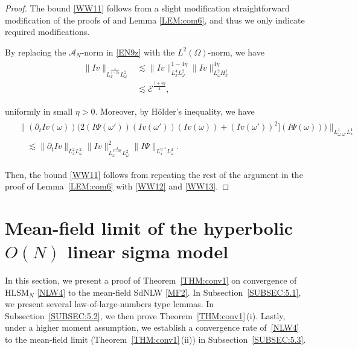 \documentclass[letterpaper, 11pt,  reqno]{amsart}
\newcommand{\1}{\hspace{0.5mm}\text{I}\hspace{0.2mm}}
\newcommand{\noi}{\noindent}
\newcommand{\dt}{\partial_t}
\newcommand{\les}{\lesssim}
\newcommand{\A}{\mathcal{A}}
\newcommand{\EE}{\mathcal{E}}
\newcommand{\HLS}{$\text{HLSM}_N$ }
\renewcommand{\O}{\Omega}
\renewcommand{\o}{\omega}
\numberwithin{equation}{section}
\numberwithin{theorem}{section}
\begin{document}
\begin{proof} 
The bound \eqref{WW11} follows
from a slight modification straightforward modification
of the proofs of 
\cite[Lemma~3.4]{GKOT}
and Lemma \ref{LEM:com6}, 
and thus we only indicate required modifications.


By replacing the $\A_N$-norm in \eqref{EN9z}
with the $L^2(\O)$-norm, we have 
 \begin{align}
\begin{split}
\|I v\|_{L^{\frac 4 {1- 2\eta}}_xL^2_\o }
&  \les 
\|I v\|_{L^4_x L^2_\o}^{1 - 4\eta}
\|I v\|_{L^2_\o H^1_x}^{4\eta}
\\
&   \les 
\EE^{\frac{1+4\eta}{4}} , 
\end{split}
\label{WW12}
 \end{align}

\noi
uniformly in small $\eta > 0$.
Moreover, by H\"older's inequality, we have 
\begin{align}
\begin{split}
& \Big\| (\dt I v (\o))
 \Big(  2  (I \Psi (\o') )( I v(\o')) ( I v(\o))  +  (I v(\o'))^2] (I \Psi (\o)) \Big) 
 \Big\|_{L^1_{\o, \o'}L^1_x}\\
& \quad \les \|\dt I v \|_{L^2_x L^2_\o}
\| I v \|_{L^\frac 4{1-2\eta}_x L^2_\o}^2
\| I \Psi \|_{L^{\eta^{-1}}_xL^2_\o}.
\end{split}
\label{WW13}
\end{align}

\noi
Then, the bound \eqref{WW11} follows from 
repeating the rest of the argument in the proof of Lemma~\ref{LEM:com6}
with \eqref{WW12} and \eqref{WW13}.
\end{proof}
























\section{Mean-field limit of 
the hyperbolic $O (N)$ linear sigma model}


\label{SEC:conv}

In this section, we present a proof of  Theorem~\ref{THM:conv1}
on convergence of \HLS 
 \eqref{NLW4}
to the mean-field SdNLW \eqref{MF2}. 
In Subsection~\ref{SUBSEC:5.1}, 
we present several law-of-large-numbers type lemmas.
In Subsection~\ref{SUBSEC:5.2}, 
we then prove Theorem~\ref{THM:conv1}\,(i). 
Lastly, 
under a higher moment assumption, 
we establish 
a convergence rate
 of~\eqref{NLW4}
 to the mean-field limit
 (Theorem~\ref{THM:conv1}\,(ii)) 
in Subsection~\ref{SUBSEC:5.3}.
\end{document}
